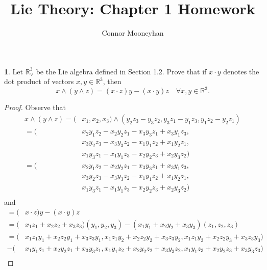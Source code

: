 \documentclass[12pt]{article}
\title{Lie Theory: Chapter 1 Homework}
\author{Connor Mooneyhan}
\date{}
\theoremstyle{definition}
\newtheorem{ex}{}
\begin{document}
\maketitle

\begin{ex}
	Let $\mathbb{R}^3_\vee$ be the Lie algebra defined in Section 1.2.
	Prove that if $x \cdot y$ denotes the dot product of vectors $x, y \in \mathbb{R}^3$, then \begin{equation*}
		x \wedge (y \wedge z) = (x \cdot z) y - (x \cdot y) z \hspace{1em}\forall x, y \in \mathbb{R}^3.
	\end{equation*}
\end{ex}
\begin{proof}
	Observe that
	\begin{align*}
		x \wedge (y \wedge z) =  ( & x_1, x_2, x_3) \wedge (y_2z_3 - y_3z_2, y_3z_1 - y_1z_3, y_1z_2 - y_2z_1) \\
		=                        ( & x_2y_1z_2 - x_2y_2z_1 - x_3y_3z_1 + x_3y_1z_3,                            \\
		                           & x_3y_2z_3 - x_3y_3z_2 - x_1y_1z_2 + x_1y_2z_1,                            \\
		                           & x_1y_3z_1 - x_1y_1z_3 - x_2y_2z_3 + x_2y_3z_2)                            \\
		=                        ( & x_2y_1z_2 - x_2y_2z_1 - x_3y_3z_1 + x_3y_1z_3,                            \\
		                           & x_3y_2z_3 - x_3y_3z_2 - x_1y_1z_2 + x_1y_2z_1,                            \\
		                           & x_1y_3z_1 - x_1y_1z_3 - x_2y_2z_3 + x_2y_3z_2)                            \\
	\end{align*}
	and \begin{align*}
		= (                        & x \cdot z)y - (x \cdot y)z                                                                               \\
		= (                        & x_1z_1 + x_2z_2 + x_3z_3)(y_1, y_2, y_3) - (x_1y_1 + x_2y_2 + x_3y_3)(z_1, z_2, z_3)                     \\
		= (                        & x_1z_1y_1 + x_2z_2y_1 + x_3z_3y_1, x_1z_1y_2 + x_2z_2y_2 + x_3z_3y_2, x_1z_1y_3 + x_2z_2y_3 + x_3z_3y_3) \\
		- (                        & x_1y_1z_1 + x_2y_2z_1 + x_3y_3z_1, x_1y_1z_2 + x_2y_2z_2 + x_3y_3z_2, x_1y_1z_3 + x_2y_2z_3 + x_3y_3z_3) \\

\end{align*}
\end{proof}
\end{document}
